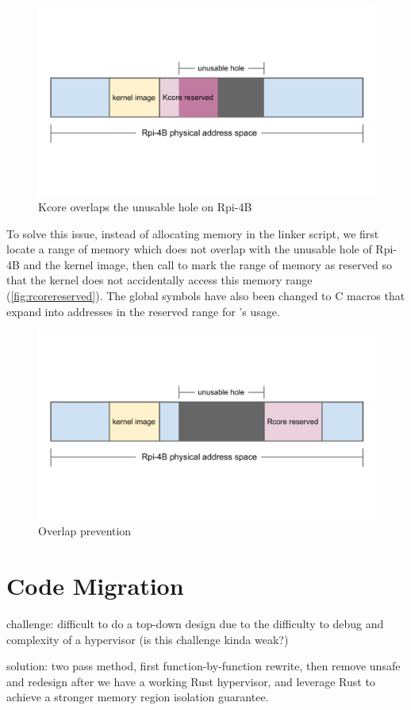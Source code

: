 \begin{figure}[hbtp]
    \includegraphics[scale=0.60]{figures/overlap.pdf}
    \caption{Kcore overlaps the unusable hole on Rpi-4B}
    \label{fig:overlap}
\end{figure}

To solve this issue, instead of allocating memory in the linker script,
we first locate a range of memory which does not overlap with the unusable hole
of Rpi-4B and the kernel image, then call  to
mark the range of memory as reserved so that the kernel does not accidentally
access this memory range (\autoref{fig:rcorereserved}).
The global symbols have also been changed to C macros that expand into
addresses in the reserved range for \rustsec{}'s \rustcore{} usage.

\begin{figure}[H]
    \includegraphics[scale=0.60]{figures/rcore_reserved.pdf}
    \caption{Overlap prevention}
    \label{fig:rcorereserved}
\end{figure}

\section{Code Migration}

challenge: difficult to do a top-down design due to the difficulty to debug
and complexity of a hypervisor (is this challenge kinda weak?)

solution: two pass method, first function-by-function rewrite, then remove
unsafe and redesign after we have a working Rust hypervisor, and leverage
Rust to achieve a stronger memory region isolation guarantee.

